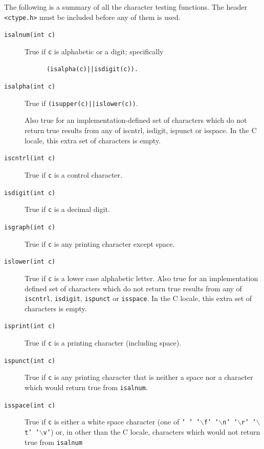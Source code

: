   The following is a summary of all the character testing
   functions.  The header \texttt{<ctype.h>} must be included before
   any of them is used.


  \begin{description}
  \item[\texttt{isalnum(int c)}] True if \texttt{c} is alphabetic or a digit;
    specifically
    \begin{Verbatim}
      (isalpha(c)||isdigit(c)).
    \end{Verbatim}

   \item[\texttt{isalpha(int c)}] 
    True if \texttt{(isupper(c)||islower(c))}.

    Also true for an implementation-defined set of characters
    which do not return true results from any of iscntrl,
    isdigit, ispunct or isspace.  In the C locale, this extra
    set of characters is empty.

   

   \item[\texttt{iscntrl(int c)}] True if \texttt{c} is a control character.

   \item[\texttt{isdigit(int c)}] True if \texttt{c} is a decimal digit.

   \item[\texttt{isgraph(int c)}] True if \texttt{c} is any printing character except space.

   \item[\texttt{islower(int c)}] True if \texttt{c} is a lower case alphabetic letter.
    Also true for an implementation defined set of characters
    which do not return true results from any of \texttt{iscntrl},
    \texttt{isdigit}, \texttt{ispunct} or \texttt{isspace}.
    In the C locale, this extra set of characters is empty.

   \item[\texttt{isprint(int c)}] True if \texttt{c} is a printing character (including space).

   \item[\texttt{ispunct(int c)}] True if \texttt{c} is any printing character that is neither a
    space nor a character which would return true from
    \texttt{isalnum}.

   \item[\texttt{isspace(int c)}] True if \texttt{c} is either a white space character (one of
    \texttt{' ' '$\backslash$f'  '$\backslash$n'  '$\backslash$r'  '$\backslash$t'  '$\backslash$v'}) or, in other than the
    C locale, characters which would not return true from
    \texttt{isalnum}


\end{description}
